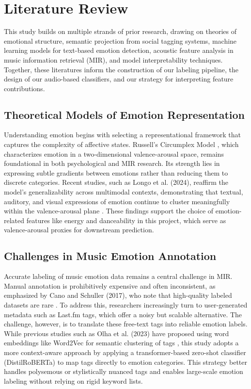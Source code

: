 \documentclass{article}
\begin{document}
\section{Literature Review}

This study builds on multiple strands of prior research, drawing on theories of emotional structure, semantic projection from social tagging systems, machine learning models for text-based emotion detection, acoustic feature analysis in music information retrieval (MIR), and model interpretability techniques. Together, these literatures inform the construction of our labeling pipeline, the design of our audio-based classifiers, and our strategy for interpreting feature contributions.

\subsection{Theoretical Models of Emotion Representation}

Understanding emotion begins with selecting a representational framework that captures the complexity of affective states. Russell's Circumplex Model \parencite{Russell1982}, which characterizes emotion in a two-dimensional valence-arousal space, remains foundational in both psychological and MIR research. Its strength lies in expressing subtle gradients between emotions rather than reducing them to discrete categories. Recent studies, such as Longo et al. (2024), reaffirm the model’s generalizability across multimodal contexts, demonstrating that textual, auditory, and visual expressions of emotion continue to cluster meaningfully within the valence-arousal plane \parencite{Longo2024}. These findings support the choice of emotion-related features like energy and danceability in this project, which serve as valence-arousal proxies for downstream prediction.

\subsection{Challenges in Music Emotion Annotation}

Accurate labeling of music emotion data remains a central challenge in MIR. Manual annotation is prohibitively expensive and often inconsistent, as emphasized by Cano and Schuller (2017), who note that high-quality labeled datasets are rare \parencite{Cano2017}. To address this, researchers increasingly turn to user-generated metadata such as Last.fm tags, which offer a noisy but scalable alternative. The challenge, however, is to translate these free-text tags into reliable emotion labels. While previous studies such as Olha et al. (2023) have proposed using word embeddings like Word2Vec for semantic clustering of tags \parencite{Olha2023}, this study adopts a more context-aware approach by applying a transformer-based zero-shot classifier (DistilRoBERTa) to map tags directly to emotion categories. This strategy better handles polysemous or stylistically nuanced tags and enables large-scale emotion labeling without relying on rigid keyword lists.
\end{document}
